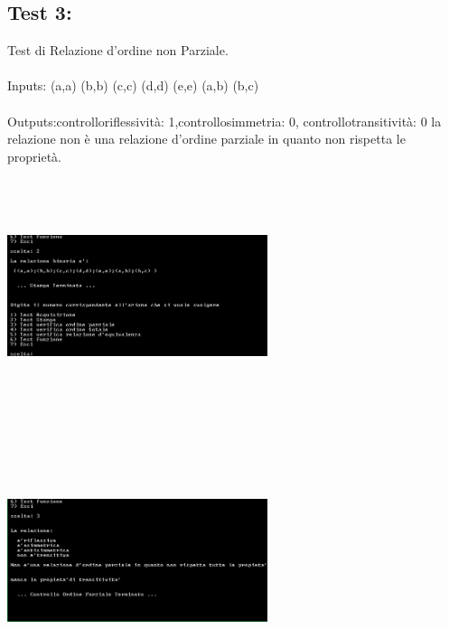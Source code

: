 \documentclass[11pt, a4paper, titlepage, block]{article}
\begin{document}
	\subsection{Test 3:} 
	Test di Relazione d'ordine non Parziale.\\
	\\
	Inputs: (a,a)  (b,b)  (c,c)  (d,d)  (e,e)  (a,b)  (b,c) \\
	\\
	Outputs:controlloriflessivit\`a:  1,controllosimmetria:  0, controllotransitivit\`a:  0
	la relazione non \`e una relazione d'ordine parziale in quanto non rispetta le propriet\`a.\\
	\includegraphics[width=3in,height=3in,viewport=0 0 300 300]{../Screenshots/Test3Input.png}
	\\
	\includegraphics[width=3in,height=3in,viewport=0 0 300 300]{../Screenshots/Test3Output.png}
	\\
	\\
	\newpage
\end{document}
